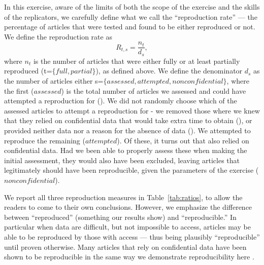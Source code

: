 In this exercise, aware of the limits of both the scope of the exercise and the skills of the replicators, we carefully define what we call the ``reproduction rate'' --- the percentage of articles that were tested and found to be either reproduced or not. 
We define the reproduction rate as
\begin{equation}
	R_{t,s}=\frac{n_{t}}{d_{s}},
\end{equation}
where $n_{t}$ is the number of articles that were either fully or at least partially reproduced (t=$\lbrace full,partial\rbrace$), as defined above. 
%
We  define the denominator $d_{s}$ as the number of articles either s=$\lbrace assessed, attempted, nonconfidential\rbrace$,  
%
where the first ($assessed$) is the total number of articles we assessed and could have attempted a reproduction for (). We did not randomly choose which of the assessed articles to attempt a reproduction for - we removed those where we knew that they relied on confidential data that would take extra time to obtain (), or provided neither data nor a reason for the absence of data (). We attempted to reproduce the remaining  ($attempted$). Of these, it turns out that  also relied on confidential data. Had we been able to properly assess these when making the initial assessment, they would also have been excluded, leaving  articles that legitimately should have been reproducible, given the parameters of the exercise ($nonconfidential$).


We  report all three reproduction measures in Table~\ref{tab:ratios}, to allow the readers to come to their own conclusions. However, we emphasize the difference between ``reproduced'' (something our results show) and ``reproducible.'' In particular when data are difficult, but not impossible to access, articles may be able to be reproduced by those with access --- thus being plausibly ``reproducible'' until proven otherwise. Many articles that rely on confidential data have been shown to be reproducible in the same way we demonstrate reproducibility here \parencite{perignon2019a,vilhuber2021,vilhuber2022a}. 

